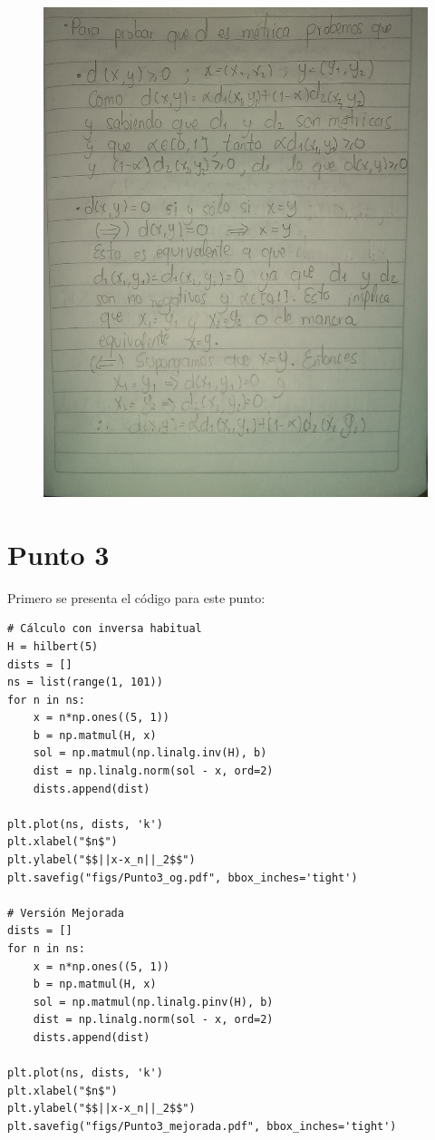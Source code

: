 \documentclass[fleqn]{article}
\begin{document}
\begin{figure}[H]
    \centering
    \includegraphics[page=2,width=\linewidth]{src/figs/punto2.pdf}
\end{figure}
\newpage
\section*{Punto 3}
Primero se presenta el código para este punto:
\begin{verbatim}
# Cálculo con inversa habitual
H = hilbert(5)
dists = []
ns = list(range(1, 101))
for n in ns:
    x = n*np.ones((5, 1))
    b = np.matmul(H, x)
    sol = np.matmul(np.linalg.inv(H), b)
    dist = np.linalg.norm(sol - x, ord=2)
    dists.append(dist)

plt.plot(ns, dists, 'k')
plt.xlabel("$n$")
plt.ylabel("$$||x-x_n||_2$$")
plt.savefig("figs/Punto3_og.pdf", bbox_inches='tight')

# Versión Mejorada
dists = []
for n in ns:
    x = n*np.ones((5, 1))
    b = np.matmul(H, x)
    sol = np.matmul(np.linalg.pinv(H), b)
    dist = np.linalg.norm(sol - x, ord=2)
    dists.append(dist)

plt.plot(ns, dists, 'k')
plt.xlabel("$n$")
plt.ylabel("$$||x-x_n||_2$$")
plt.savefig("figs/Punto3_mejorada.pdf", bbox_inches='tight')
\end{verbatim}
\end{document}
